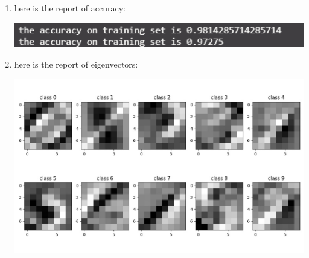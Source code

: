 \documentclass[12pt]{article}
\begin{document}
\begin{enumerate}
\begin{enumerate}
      \item here is the report of accuracy:
        \begin{center}\includegraphics[scale=1]{q4b.png} \end{center} 
      \newpage
      \item here is the report of eigenvectors:
        \begin{center}\includegraphics[scale=0.5]{eigenvector.jpg} \end{center} 
    \end{enumerate}
  \end{enumerate}
\end{document}
